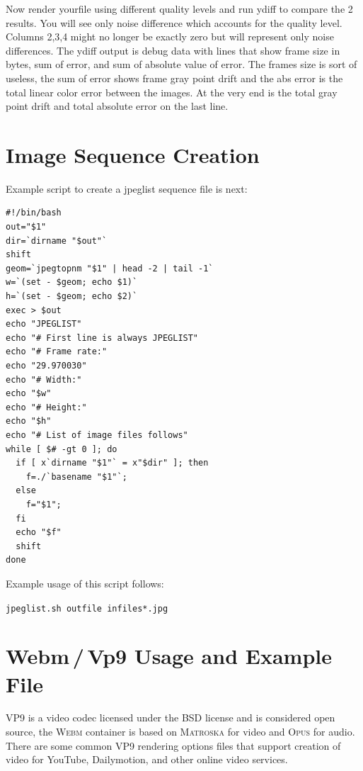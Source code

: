 Now render yourfile using different quality levels and run ydiff to compare the 2 results. You will see only noise difference which accounts for the quality level. Columns 2,3,4 might no longer be exactly zero but will represent only noise differences. The ydiff output is debug data with lines that show frame size in bytes, sum of error, and sum of absolute value of error. The frames size is sort of useless, the sum of error shows frame gray point drift and the abs error is the total linear color error between the images. At the very end is the total gray point drift and total absolute error on the last line.


\section{Image Sequence Creation}
\label{sec:image_sequence_creation}

Example script to create a jpeglist sequence file is next:
\begin{lstlisting}[numbers=none]
#!/bin/bash
out="$1"
dir=`dirname "$out"`
shift
geom=`jpegtopnm "$1" | head -2 | tail -1`
w=`(set - $geom; echo $1)`
h=`(set - $geom; echo $2)`
exec > $out
echo "JPEGLIST"
echo "# First line is always JPEGLIST"
echo "# Frame rate:"
echo "29.970030"
echo "# Width:"
echo "$w"
echo "# Height:"
echo "$h"
echo "# List of image files follows"
while [ $# -gt 0 ]; do
  if [ x`dirname "$1"` = x"$dir" ]; then
	f=./`basename "$1"`;
  else
	f="$1";
  fi
  echo "$f"
  shift
done
\end{lstlisting}
Example usage of this script follows:

\qquad \texttt{jpeglist.sh outfile infiles*.jpg}

\section{Webm\,/\,Vp9 Usage and Example File}
\label{sec:webm/vp9_usage_example}

\textsc{VP9} is a video codec licensed under the BSD license and is
considered open source,
the \textsc{Webm} container is based on \textsc{Matroska} for video
and \textsc{Opus} for audio. There are some common \textsc{VP9} rendering
options files that support creation of video for YouTube,
Dailymotion, and other online video services.

